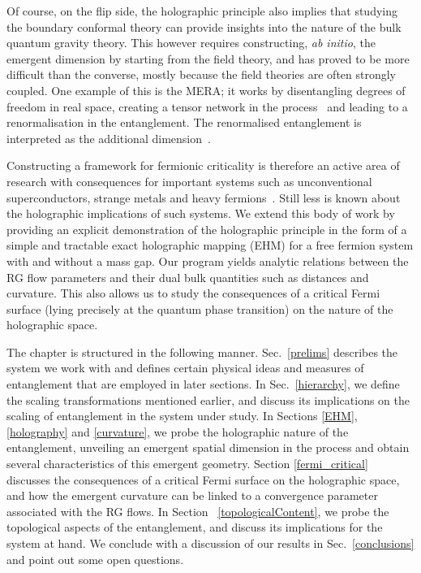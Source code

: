 Of course, on the flip side, the holographic principle also implies that studying the boundary conformal theory can provide insights into the nature of the bulk quantum gravity theory.
This however requires constructing, {\it ab initio}, the emergent dimension by starting from the field theory, and has proved to be more difficult than the converse, mostly because the field theories are often strongly coupled.
One example of this is the MERA; it works by disentangling degrees of freedom in real space, creating a tensor network in the process~\cite{evenbly2011,reyes_2020,McMahon2020} and leading to a renormalisation in the entanglement. The renormalised entanglement is interpreted as the additional dimension~\cite{swingle2012a}.

Constructing a framework for fermionic criticality is therefore an active area of research with consequences for important systems such as unconventional superconductors, strange metals and heavy fermions~\cite{anirbanmott1,anirbanmott2,anirban_mott_2022,Custers2003}. Still less is known about the holographic implications of such systems. We extend this body of work by providing an explicit demonstration of the holographic principle in the form of a simple and tractable exact holographic mapping (EHM) for a free fermion system with and without a mass gap. Our program yields analytic relations between the RG flow parameters and their dual bulk quantities such as distances and curvature. This also allows us to study the consequences of a critical Fermi surface (lying precisely at the quantum phase transition) on the nature of the holographic space.

The chapter is structured in the following manner. Sec.~\ref{prelims} describes the system we work with and defines certain physical ideas and measures of entanglement that are employed in later sections. In Sec.~\ref{hierarchy}, we define the scaling transformations mentioned earlier, and discuss its implications on the scaling of entanglement in the system under study.
In Sections \ref{EHM},\ref{holography} and \ref{curvature}, we probe the holographic nature of the entanglement, unveiling an emergent spatial dimension in the process and obtain several characteristics of this emergent geometry.
Section \ref{fermi_critical} discusses the consequences of a critical Fermi surface on the holographic space, and how the emergent curvature can be linked to a convergence parameter associated with the RG flows.
In Section ~\ref{topologicalContent}, we probe the topological aspects of the entanglement, and discuss its implications for the system at hand.
We conclude with a discussion of our results in Sec.~\ref{conclusions} and point out some open questions. 

